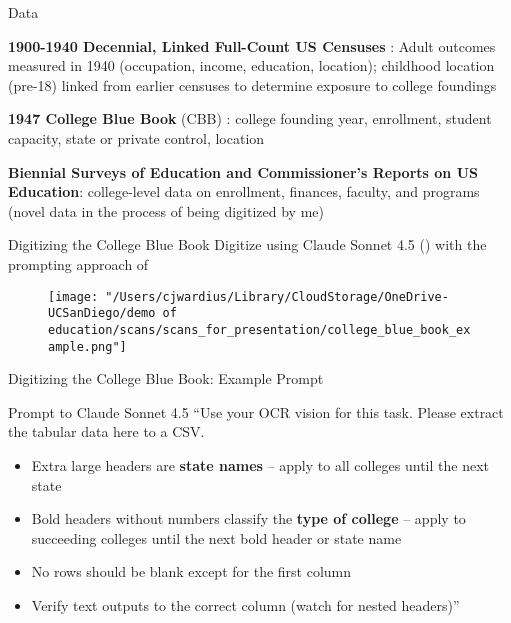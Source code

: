 \documentclass[notes,11pt, aspectratio=169]{beamer}
\newenvironment{wideitemize}{\itemize\addtolength{\itemsep}{10pt}}{\enditemize}
\begin{document}
\begin{frame}{Data}
  \begin{wideitemize}
    \item \textbf{1900-1940 Decennial, Linked Full-Count US Censuses} \cite{rugglesIPUMSUSAVersion2025}: Adult outcomes measured in 1940 (occupation, income, education, location); childhood location (pre-18) linked from earlier censuses to determine exposure to college foundings
    \item \textbf{1947 College Blue Book} (CBB) \cite{hurt1947college}: college founding year, enrollment, student capacity, state or private control, location
    \item \textbf{Biennial Surveys of Education and Commissioner's Reports on US Education}: college-level data on enrollment, finances, faculty, and programs (novel data in the process of being digitized by me)  
  \end{wideitemize}
\end{frame}


\begin{frame}{Digitizing the College Blue Book}
    Digitize using Claude Sonnet 4.5 (\cite{anthropicClaudeSonnet452025}) with the prompting approach of \cite{backer-peralCanLLMsCredibly2025}
\begin{figure}
   \centering
        \texttt{[image: "/Users/cjwardius/Library/CloudStorage/OneDrive-UCSanDiego/demo of education/scans/scans\_for\_presentation/college\_blue\_book\_example.png"]}
\end{figure}
\end{frame}

\begin{frame}{Digitizing the College Blue Book: Example Prompt}
\begin{block}{Prompt to Claude Sonnet 4.5}
\small
``Use your OCR vision for this task. Please extract the tabular data here to a CSV.
\begin{itemize}
    \item Extra large headers are \textbf{state names} -- apply to all colleges until the next state
    \item Bold headers without numbers classify the \textbf{type of college} -- apply to succeeding colleges until the next bold header or state name
    \item No rows should be blank except for the first column
    \item Verify text outputs to the correct column (watch for nested headers)''
\end{itemize}
\end{block}
\end{frame}
\end{document}
